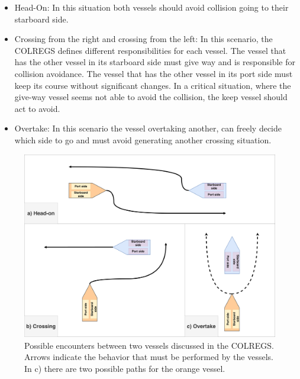     \begin{itemize}
        \item Head-On: In this situation both vessels should avoid collision going to their starboard side.
        \item Crossing from the right and crossing from the left: In this scenario, the \ac{COLREGS} defines different responsibilities for each vessel. The vessel that has the other vessel in its starboard side must give way and is responsible for collision avoidance. The vessel that has the other vessel in its port side must keep its course without significant changes. In a critical situation, where the give-way vessel seems not able to avoid the collision, the keep vessel should act to avoid.
        \item Overtake: In this scenario the vessel overtaking another, can freely decide which side to go and must avoid generating another crossing situation.
    \end{itemize}
    
    \begin{figure}[H]
        \centering
        \includegraphics[scale=0.125]{figs/Chap2/Encounters.pdf}
        \caption{Possible encounters between two vessels discussed in the \ac{COLREGS}. Arrows indicate the behavior that must be performed by the vessels. In c) there are two possible paths for the orange vessel. }
        \label{fig:chap2_encounters}
    \end{figure}